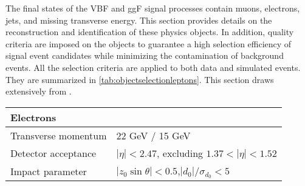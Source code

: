The final states of the VBF and ggF signal processes contain muons, electrons, jets, and missing transverse energy. 
This section provides details on the reconstruction and identification of these physics objects. 
In addition, quality criteria are imposed on the objects to guarantee a high selection efficiency of signal event candidates while minimizing the contamination of background events. All the selection criteria are applied to both data and simulated events. They are summarized in \cref{tab:objectselectionleptons}.
This section draws extensively from .

\begin{table}
    \centering
    \begin{tabular}{l@{\hskip 0.5in} l}
        \toprule
        Electrons                &                                                              \\
        \midrule
        Transverse momentum      & 22 GeV / 15 GeV                                              \\
        Detector acceptance      & $|\eta| < 2.47$, excluding $1.37 < |\eta| < 1.52$            \\
        Impact parameter         & $|z_0\sin\theta| < 0.5$,\quad $|d_0|/\sigma_{d_0} < 5$       \\


\end{tabular}
\end{table}
